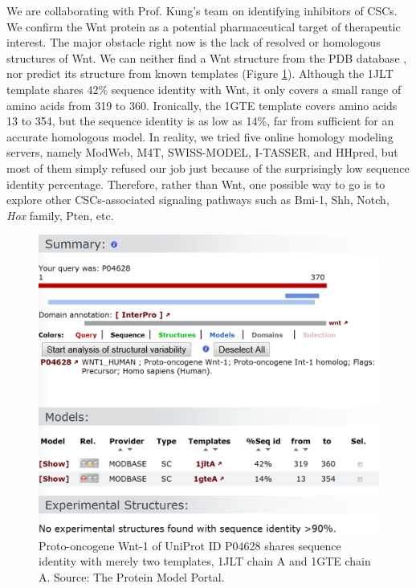 We are collaborating with Prof. Kung's team on identifying inhibitors of CSCs. We confirm the Wnt protein as a potential pharmaceutical target of therapeutic interest. The major obstacle right now is the lack of resolved or homologous structures of Wnt. We can neither find a Wnt structure from the PDB database \citep{540,537}, nor predict its structure from known templates (Figure \ref{Case:WntHomologyModeling}). Although the 1JLT template shares 42\% sequence identity with Wnt, it only covers a small range of amino acids from 319 to 360. Ironically, the 1GTE template covers amino acids 13 to 354, but the sequence identity is as low as 14\%, far from sufficient for an accurate homologous model. In reality, we tried five online homology modeling servers, namely ModWeb, M4T, SWISS-MODEL, I-TASSER, and HHpred, but most of them simply refused our job just because of the surprisingly low sequence identity percentage. Therefore, rather than Wnt, one possible way to go is to explore other CSCs-associated signaling pathways such as Bmi-1, Shh, Notch, \textit{Hox} family, Pten, etc.

\begin{figure}
\centering
\includegraphics[width=\linewidth]{Case/WntHomologyModeling.png}
\caption{Proto-oncogene Wnt-1 of UniProt ID P04628 shares sequence identity with merely two templates, 1JLT chain A and 1GTE chain A. Source: The Protein Model Portal.}
\label{Case:WntHomologyModeling}
\end{figure}

\chapterend
